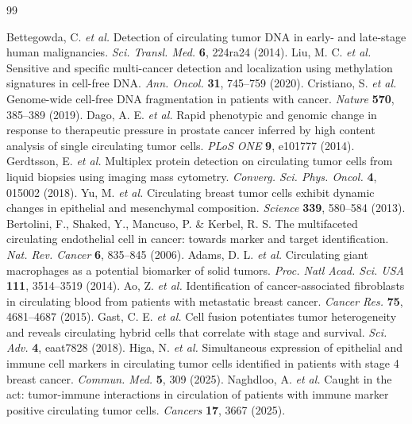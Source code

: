 \documentclass[11pt]{article}
\begin{document}
\begin{thebibliography}{99}
\small

 Bettegowda, C. \textit{et al.} Detection of circulating tumor DNA in early- and late-stage human malignancies. \textit{Sci. Transl. Med.} \textbf{6}, 224ra24 (2014).
 Liu, M. C. \textit{et al.} Sensitive and specific multi-cancer detection and localization using methylation signatures in cell-free DNA. \textit{Ann. Oncol.} \textbf{31}, 745--759 (2020).
 Cristiano, S. \textit{et al.} Genome-wide cell-free DNA fragmentation in patients with cancer. \textit{Nature} \textbf{570}, 385--389 (2019).
 Dago, A. E. \textit{et al.} Rapid phenotypic and genomic change in response to therapeutic pressure in prostate cancer inferred by high content analysis of single circulating tumor cells. \textit{PLoS ONE} \textbf{9}, e101777 (2014).
 Gerdtsson, E. \textit{et al.} Multiplex protein detection on circulating tumor cells from liquid biopsies using imaging mass cytometry. \textit{Converg. Sci. Phys. Oncol.} \textbf{4}, 015002 (2018).
 Yu, M. \textit{et al.} Circulating breast tumor cells exhibit dynamic changes in epithelial and mesenchymal composition. \textit{Science} \textbf{339}, 580--584 (2013).
 Bertolini, F., Shaked, Y., Mancuso, P. \& Kerbel, R. S. The multifaceted circulating endothelial cell in cancer: towards marker and target identification. \textit{Nat. Rev. Cancer} \textbf{6}, 835--845 (2006).
 Adams, D. L. \textit{et al.} Circulating giant macrophages as a potential biomarker of solid tumors. \textit{Proc. Natl Acad. Sci. USA} \textbf{111}, 3514--3519 (2014).
 Ao, Z. \textit{et al.} Identification of cancer-associated fibroblasts in circulating blood from patients with metastatic breast cancer. \textit{Cancer Res.} \textbf{75}, 4681--4687 (2015).
 Gast, C. E. \textit{et al.} Cell fusion potentiates tumor heterogeneity and reveals circulating hybrid cells that correlate with stage and survival. \textit{Sci. Adv.} \textbf{4}, eaat7828 (2018).
 Higa, N. \textit{et al.} Simultaneous expression of epithelial and immune cell markers in circulating tumor cells identified in patients with stage 4 breast cancer. \textit{Commun. Med.} \textbf{5}, 309 (2025).
 Naghdloo, A. \textit{et al.} Caught in the act: tumor-immune interactions in circulation of patients with immune marker positive circulating tumor cells. \textit{Cancers} \textbf{17}, 3667 (2025).

\end{thebibliography}
\end{document}
